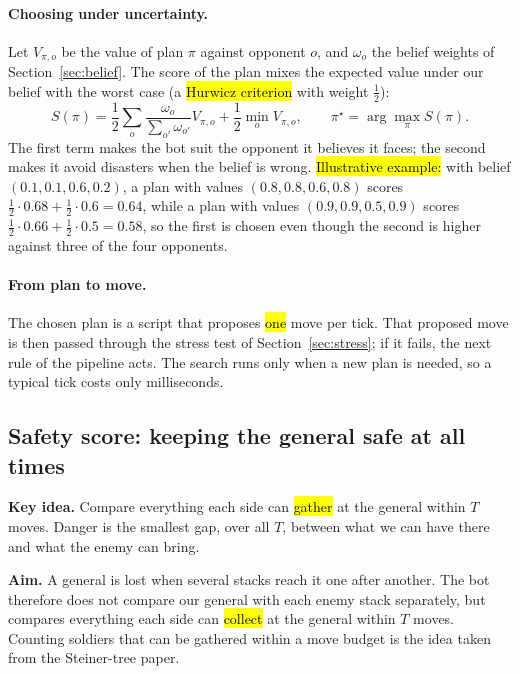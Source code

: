 \paragraph{Choosing under uncertainty.} Let $V_{\pi,o}$ be the value of plan $\pi$ against opponent $o$, and
$\omega_o$ the belief weights of Section~\ref{sec:belief}. The score of the plan mixes the expected value under
our belief with the worst case (a \hl{Hurwicz criterion} with weight $\tfrac12$):
\begin{equation}
S(\pi)=\frac12\sum_o\frac{\omega_o}{\sum_{o'}\omega_{o'}}V_{\pi,o}+\frac12\min_o V_{\pi,o},\qquad
\pi^\star=\arg\max_\pi S(\pi).
\end{equation}
The first term makes the bot suit the opponent it believes it faces; the second makes it avoid disasters when
the belief is wrong. \hl{Illustrative example:} with belief $(0.1,0.1,0.6,0.2)$, a plan with values
$(0.8,0.8,0.6,0.8)$ scores $\tfrac12\cdot0.68+\tfrac12\cdot0.6=0.64$, while a plan with values
$(0.9,0.9,0.5,0.9)$ scores $\tfrac12\cdot0.66+\tfrac12\cdot0.5=0.58$, so the first is chosen even though the
second is higher against three of the four opponents.

\paragraph{From plan to move.} The chosen plan is a script that proposes \hl{one} move per tick. That proposed
move is then passed through the stress test of Section~\ref{sec:stress}; if it fails, the next rule of the
pipeline acts. The search runs only when a new plan is needed, so a typical tick costs only milliseconds.

\subsection{Safety score: keeping the general safe at all times}\label{sec:safety}

\begin{keyidea}
\textbf{Key idea.} Compare everything each side can \hl{gather} at the general within $T$ moves. Danger is the
smallest gap, over all $T$, between what we can have there and what the enemy can bring.
\end{keyidea}

\textbf{Aim.} A general is lost when several stacks reach it one after another. The bot therefore does not
compare our general with each enemy stack separately, but compares everything each side can \hl{collect} at
the general within $T$ moves. Counting soldiers that can be gathered within a move budget is the idea taken
from the Steiner-tree paper.

